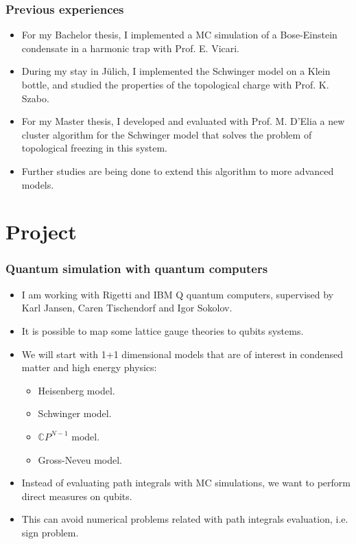 \documentclass[11pt,t,xcolor=dvipsnames,aspectratio=169]{beamer}
\begin{document}
\begin{frame}
    \frametitle{Previous experiences}
    \begin{itemize}
        \item
            For my Bachelor thesis, I implemented a MC simulation of a Bose-Einstein condensate in a harmonic trap with Prof. E. Vicari.
        \item
            During my stay in J\"ulich, I implemented the Schwinger model on a Klein bottle, and studied the properties of the topological charge with Prof. K. Szabo.
        \item
            For my Master thesis, 
            I developed and evaluated with Prof. M. D'Elia
            a new cluster algorithm for the Schwinger model that solves the problem of topological freezing in this system.
        \item
            Further studies are being done to extend this algorithm to more advanced models.
    \end{itemize}
\end{frame}

\section{Project}

\begin{frame}
    \frametitle{Quantum simulation with quantum computers}
    \begin{itemize}
        \item
            I am working with Rigetti and IBM Q quantum computers, supervised by Karl Jansen, Caren Tischendorf and Igor Sokolov.
        \item
            It is possible to map some lattice gauge theories to qubits systems.
        \item
            We will start with 1+1 dimensional models that are of interest in condensed matter and high energy physics:
            \begin{itemize}
                \item Heisenberg model.
                \item Schwinger model.
                \item $\mathbb CP^{N-1}$ model.
                \item Gross-Neveu model.
            \end{itemize}
        \item
            Instead of evaluating path integrals with MC simulations,
            we want to perform direct measures on qubits.
        \item
            This can avoid numerical problems related with path integrals evaluation, i.e. sign problem.
    \end{itemize}
\end{frame}
\end{document}
